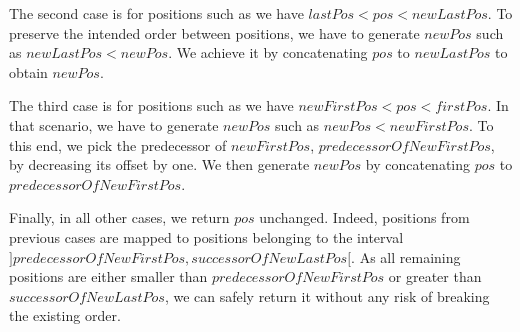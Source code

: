 \documentclass{article}
\theoremstyle{definition}
\begin{document}
The second case is for positions such as we have $lastPos < pos < newLastPos$.
To preserve the intended order between positions, we have to generate $newPos$ such as $newLastPos < newPos$.
We achieve it by concatenating $pos$ to $newLastPos$ to obtain $newPos$.

The third case is for positions such as we have $newFirstPos < pos < firstPos$.
In that scenario, we have to generate $newPos$ such as $newPos < newFirstPos$.
To this end, we pick the predecessor of $newFirstPos$, $predecessorOfNewFirstPos$, by decreasing its offset by one.
We then generate $newPos$ by concatenating $pos$ to $predecessorOfNewFirstPos$.

Finally, in all other cases, we return $pos$ unchanged.
Indeed, positions from previous cases are mapped to positions belonging to the interval $]predecessorOfNewFirstPos, successorOfNewLastPos[$.
As all remaining positions are either smaller than $predecessorOfNewFirstPos$ or greater than $successorOfNewLastPos$, we can safely return it without any risk of breaking the existing order.

\end{document}

